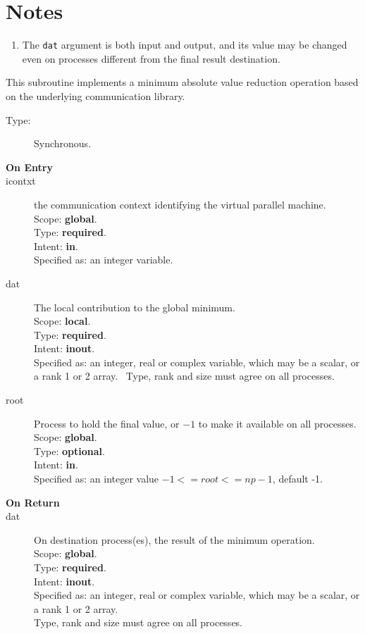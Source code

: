 \section*{Notes}
\begin{enumerate}
\item The \verb|dat| argument is both input and output, and its
  value may be changed even on processes different from the final
  result destination.
\end{enumerate}



This subroutine implements a minimum absolute value reduction
operation based on the underlying communication library. 
\begin{description}
\item[Type:] Synchronous.
\item[\bf  On Entry ]
\item[icontxt] the communication context identifying the virtual
  parallel machine.\\
Scope: {\bf global}.\\
Type: {\bf required}.\\
Intent: {\bf in}.\\
Specified as: an integer variable.
\item[dat] The local contribution to the global minimum.\\
Scope: {\bf local}.\\
Type: {\bf required}.\\
Intent: {\bf inout}.\\
Specified as: an integer, real or complex variable, which may be a
scalar, or a rank 1 or 2 array. \
Type, rank and size must agree on all processes.
\item[root] Process to hold the final value, or $-1$ to make it available
  on all processes.\\
Scope: {\bf global}.\\
Type: {\bf optional}.\\
Intent: {\bf in}.\\
Specified as: an integer value $-1<= root <= np-1$, default -1. \\
\end{description}


\begin{description}
\item[\bf On Return]
\item[dat] On destination process(es), the result of the minimum operation.\\
Scope: {\bf global}.\\
Type: {\bf required}.\\
Intent: {\bf inout}.\\
Specified as: an integer, real or complex variable, which may be a
scalar, or a rank 1 or 2 array. \\
Type, rank and size must agree on all processes.
\end{description}


